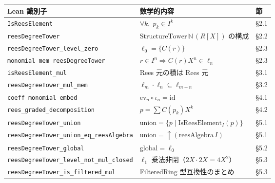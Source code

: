 \documentclass[a4paper,12pt]{article}
\theoremstyle{definition}
\theoremstyle{plain}
\newcommand{\lev}[1]{\ell_{#1}}
\newcommand{\IsRees}{\mathrm{IsReesElement}}
\newcommand{\STower}{\mathrm{StructureTower}}
\newcommand{\unionop}{\mathrm{union}}
\newcommand{\globalop}{\mathrm{global}}
\begin{document}
\begin{center}
\renewcommand{\arraystretch}{1.3}
\begin{tabular}{lll}
\toprule
Lean 識別子 & 数学的内容 & 節 \\
\midrule
\texttt{IsReesElement} & $\forall k,\; p_k \in I^k$ & \S{}2.1 \\
\texttt{reesDegreeTower} & $\STower\,\mathbb{N}\,(R[X])$ の構成 & \S{}2.2 \\
\texttt{reesDegreeTower\_level\_zero} & $\lev{0} = \{C(r)\}$ & \S{}2.3 \\
\texttt{monomial\_mem\_reesDegreeTower} & $r \in I^n \Rightarrow C(r)X^n \in \lev{n}$ & \S{}2.3 \\
\texttt{isReesElement\_mul} & Rees 元の積は Rees 元 & \S{}3.1 \\
\texttt{reesDegreeTower\_mul\_mem} & $\lev{m} \cdot \lev{n} \subseteq \lev{m+n}$ & \S{}3.2 \\
\texttt{coeff\_monomial\_embed} & $\mathrm{ev}_n \circ \iota_n = \mathrm{id}$ & \S{}4.1 \\
\texttt{rees\_graded\_decomposition} & $p = \sum C(p_k)X^k$ & \S{}4.2 \\
\texttt{reesDegreeTower\_union} & $\unionop = \{p \mid \IsRees_I(p)\}$ & \S{}5.1 \\
\texttt{reesDegreeTower\_union\_eq\_reesAlgebra} & $\unionop = \uparrow(\mathrm{reesAlgebra}\,I)$ & \S{}5.1 \\
\texttt{reesDegreeTower\_global} & $\globalop = \lev{0}$ & \S{}5.2 \\
\texttt{reesDegreeTower\_level\_not\_mul\_closed} & $\lev{1}$ 乗法非閉（$2X \cdot 2X = 4X^2$） & \S{}5.3 \\
\texttt{reesDegreeTower\_is\_filtered\_mul} & FilteredRing 型互換性のまとめ & \S{}5.3 \\
\bottomrule
\end{tabular}
\end{center}
\end{document}
